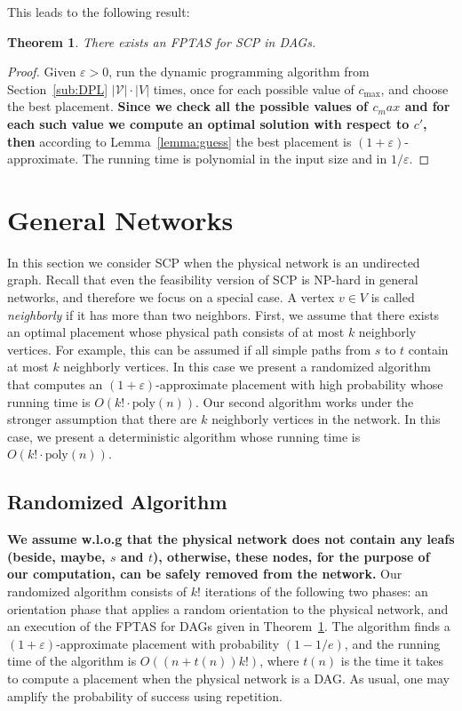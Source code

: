 \documentclass[11pt]{article}
\newcommand{\fix}[1]{{\color{purple}\textbf{#1}}}
\newtheorem{theorem}{Theorem}
\newcommand{\abs}[1]{\left| #1 \right|}
\newcommand{\eps}{\varepsilon}
\newcommand{\scp}{\textsc{SCP}\xspace}
\newcommand{\calV}{\mathcal{V}}
\begin{document}
This leads to the following result:

\begin{theorem}
\label{thm:fptas}
There exists an FPTAS for \scp in DAGs.
\end{theorem}
\begin{proof}
Given $\eps>0$, run the dynamic programming algorithm from
Section~\ref{sub:DPL} $\abs{\calV} \cdot \abs{V}$ times, once for each
possible value of $c_{\max}$, and choose the best placement.
\fix{Since we check all the possible values of $c_max$ and for each such value we compute an optimal solution with respect to $c'$, then} according to Lemma~\ref{lemma:guess} the best placement is $(1+\eps)$-approximate.  
The running time is polynomial in the input size and in $1/\eps$.
\end{proof}



\section{General Networks}
\label{sec:general}

In this section we consider \scp when the physical network is an
undirected graph.  Recall that even the feasibility version of \scp is
NP-hard in general networks, and therefore we focus on a special case.
%
A vertex $v \in V$ is called \emph{neighborly} if it has more than two
neighbors.
%
First, we assume that there exists an optimal placement whose physical
path consists of at most $k$ neighborly vertices.  For example, this
can be assumed if all simple paths from $s$ to $t$ contain at most $k$
neighborly vertices.  In this case we present a randomized algorithm
that computes an $(1+\eps)$-approximate placement with high
probability whose running time is $O(k! \cdot \text{poly}(n))$.
%
Our second algorithm works under the stronger assumption that there
are $k$ neighborly vertices in the network.  In this case, we present
a deterministic algorithm whose running time is $O(k! \cdot
\text{poly}(n))$.


\subsection{Randomized Algorithm}

\fix{We assume w.l.o.g that the physical network does not contain any leafs (beside, maybe, $s$ and $t$), otherwise, these nodes, for the purpose of our computation, can be safely removed from the network.}
Our randomized algorithm consists of $k!$ iterations of the following
two phases: an orientation phase that applies a random orientation to
the physical network, and an execution of the FPTAS for DAGs given in
Theorem~\ref{thm:fptas}.  The algorithm finds a $(1+\eps)$-approximate
placement with probability $(1-1/e)$, and the running time of the
algorithm is $O((n+t(n))k!)$, where $t(n)$ is the time it takes to
compute a placement when the physical network is a DAG.
%
As usual, one may amplify the probability of success using repetition.
\end{document}
